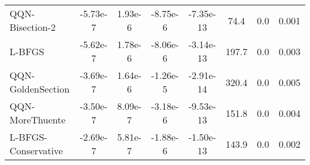 \documentclass{article}
\begin{document}
\begin{table}[htbp]
{\begin{tabular}{l*{7}{S[table-format=2.2e-1]}}
QQN-Bisection-2 & -5.73e-7 & 1.93e-6 & -8.75e-6 & -7.35e-13 & 74.4 & 0.0 & 0.001 \\
L-BFGS & -5.62e-7 & 1.78e-6 & -8.06e-6 & -3.14e-13 & 197.7 & 0.0 & 0.003 \\
QQN-GoldenSection & -3.69e-7 & 1.64e-6 & -1.26e-5 & -2.91e-14 & 320.4 & 0.0 & 0.005 \\
QQN-MoreThuente & -3.50e-7 & 8.09e-7 & -3.18e-6 & -9.53e-13 & 151.8 & 0.0 & 0.004 \\
L-BFGS-Conservative & -2.69e-7 & 5.81e-7 & -1.88e-6 & -1.50e-13 & 143.9 & 0.0 & 0.002 \\
\bottomrule
\end{tabular}
}
\end{table}
\end{document}
